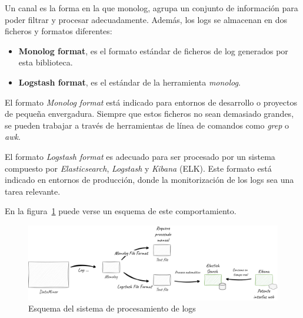 Un canal es la forma en la que monolog, agrupa un conjunto de información para poder filtrar y procesar adecuadamente.
Además, los logs se almacenan en dos ficheros y formatos diferentes:

\begin{itemize}
    \item
    \textbf{Monolog format}, es el formato estándar de ficheros de log generados por esta biblioteca.

    \item
    \textbf{Logstash format}, es el estándar de la herramienta \textit{monolog}.
\end{itemize}

El formato \textit{Monolog format} está indicado para entornos de desarrollo o proyectos de pequeña envergadura.
Siempre que estos ficheros no sean demasiado grandes, se pueden trabajar a través de herramientas de línea de comandos
como \textit{grep} o \textit{awk}.

El formato \textit{Logstash format} es adecuado para ser procesado por un sistema compuesto por
\textit{Elasticsearch}, \textit{Logstash} y \textit{Kibana} (ELK).
Este formato está indicado en entornos de producción, donde la monitorización de los logs sea una tarea relevante.

En la figura~\ref{fig:chapter_4.4.logs_overview} puede verse un esquema de este comportamiento.

\begin{figure}[ht]
    \begin{center}
        \includegraphics[width=\textwidth]{./chapter/4/images/chapter_4.4.logs_overview}
        \caption{Esquema del sistema de procesamiento de logs}
        \label{fig:chapter_4.4.logs_overview}
    \end{center}
\end{figure}